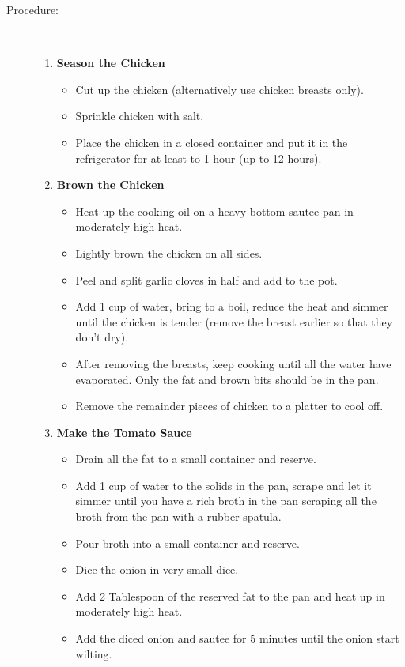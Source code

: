 \documentclass[11pt,letterpaper]{article}
\begin{document}
\begin{description}
\item[Procedure:]\ \\
	\begin{enumerate}
	\item{\bf Season the Chicken}
	\begin{itemize}
        \item Cut up the chicken (alternatively use chicken breasts only).
        \item Sprinkle chicken with salt.
        \item Place the chicken in a closed container and put it in
              the refrigerator for at least to 1 hour (up to 12 hours).
        \end{itemize}
        \item{\bf Brown the Chicken}
        \begin{itemize}
        \item Heat up the cooking oil on a heavy-bottom sautee pan in moderately high heat.
        \item Lightly brown the chicken on all sides.
        \item Peel and split garlic cloves in half and add to the pot.
        \item Add 1 cup of water, bring to a boil, reduce
          the heat and simmer until the chicken is tender (remove the breast earlier so that they don't dry).
        \item After removing the breasts, keep cooking until all the water have evaporated. Only the fat and brown bits should be in the pan.
        \item Remove the remainder pieces of chicken to a platter to cool off.
        \end{itemize}
        \item{\bf Make the Tomato Sauce}
        \begin{itemize}
        \item Drain all the fat to a small container and reserve.
        \item Add 1 cup of water to the solids in the pan, scrape and let it simmer until you have a rich broth in the pan scraping all the broth from the pan with a rubber spatula.
        \item Pour broth into a small container and reserve.
        \item Dice the onion in very small dice.
        \item Add 2 Tablespoon of the reserved fat to the pan and heat up in moderately high heat.
        \item Add the diced onion and sautee for 5 minutes until the onion start wilting.

\end{itemize}
\end{enumerate}
\end{description}
\end{document}
